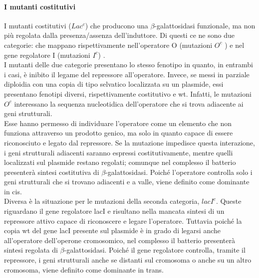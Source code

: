\documentclass{article}
\begin{document}
\paragraph{I mutanti costitutivi}
I mutanti costitutivi ($Lac^{c}$) che producono una $\beta$-galattosidasi funzionale, ma non più regolata dalla presenza/assenza 
dell'induttore. Di questi ce ne sono due categorie: 
che mappano rispettivamente nell'operatore O
(mutazioni $O^{c}$ ) e nel gene regolatore I (mutazioni $I^{c}$) .\\
I mutanti delle due categorie presentano lo stesso fenotipo in quanto, in entrambi i casi, è inibito il
legame del repressore all'operatore. Invece, se messi in parziale diploidia con una
copia di tipo selvatico localizzata su un plasmide, essi presentano fenotipi diversi,
rispettivamente costitutivo e wt. Infatti, le mutazioni $O^{c}$ interessano la sequenza
nucleotidica dell'operatore che si trova adiacente ai geni strutturali.\\
Esse hanno permesso di individuare l'operatore come un elemento che non funziona attraverso un prodotto genico, ma solo in quanto capace di 
essere riconosciuto e legato dal repressore. Se la mutazione impedisce questa interazione, i geni
strutturali adiacenti saranno espressi costitutivamente, mentre quelli localizzati sul
plasmide restano regolati; comunque nel complesso il batterio presenterà sintesi
costitutiva di $\beta$-galattosidasi. Poiché l'operatore controlla solo i geni strutturali
che si trovano adiacenti e a valle, viene definito come dominante in cis.\\
Diversa è la situazione per le mutazioni della seconda categoria, $lacI^{c}$. Queste riguardano il gene regolatore lacI e risultano nella mancata
sintesi di un repressore attivo capace di riconoscere e legare l'operatore.
Tuttavia poiché la copia wt del gene lacI presente sul plasmide è in grado di legarsi anche all'operatore dell'operone cromosomico, nel complesso il batterio presenterà
sintesi regolata di $\beta$-galattosidasi. Poiché il gene regolatore controlla, tramite il
repressore, i geni strutturali anche se distanti sul cromosoma o anche su un altro
cromosoma, viene definito come dominante in trans.
\end{document}
